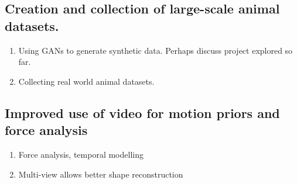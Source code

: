 
\subsection{Creation and collection of large-scale animal datasets.}

\begin{enumerate}
    \item Using GANs to generate synthetic data. Perhaps discuss project explored so far.
    \item Collecting real world animal datasets.
\end{enumerate}


\subsection{Improved use of video for motion priors and force analysis}

\begin{enumerate}
    \item Force analysis, temporal modelling
    \item Multi-view allows better shape reconstruction
\end{enumerate}










